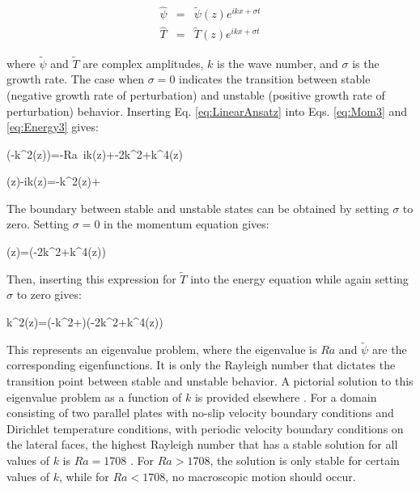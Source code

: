 \documentclass[10pt]{article}
\numberwithin{equation}{section} %
\begin{document}
\begin{subequations}
\label{eq:LinearAnsatz}
\begin{eqnarray}
\hat{\psi}&=&\tilde{\psi}(z)e^{ikx+\sigma t}\\
\hat{T}&=&\tilde{T}(z)e^{ikx+\sigma t}
\end{eqnarray}
\end{subequations}

where \(\tilde{\psi}\) and \(\tilde{T}\) are complex amplitudes, \(k\) is the wave number, and \(\sigma\) is the growth rate. The case when \(\sigma=0\) indicates the transition between stable (negative growth rate of perturbation) and unstable (positive growth rate of perturbation) behavior. Inserting Eq. \eqref{eq:LinearAnsatz} into Eqs. \eqref{eq:Mom3} and \eqref{eq:Energy3} gives:

\beq
{}\left(-k^2\tilde{\psi}(z)\right)=-Ra\ ik(z)+-2k^2+k^4\tilde{\psi}(z)
\eeq

\beq
\sigma{}(z)-ik\tilde{\psi}(z)=-k^2(z)+
\eeq

The boundary between stable and unstable states can be obtained by setting \(\sigma\) to zero. Setting \(\sigma=0\) in the momentum equation gives:

\beq
{}(z)=\left(-2k^2+k^4\tilde{\psi}(z)\right)
\eeq

Then, inserting this expression for \(\tilde{T}\) into the energy equation while again setting \(\sigma\) to zero gives:

\beq
k^2\tilde{\psi}(z)=\left(-k^2+\right)\left\lbrack\left(-2k^2+k^4\tilde{\psi}(z)\right)\right\rbrack
\eeq

This represents an eigenvalue problem, where the eigenvalue is \(Ra\) and \(\tilde{\psi}\) are the corresponding eigenfunctions. It is only the Rayleigh number that dictates the transition point between stable and unstable behavior. A pictorial solution to this eigenvalue problem as a function of \(k\) is provided elsewhere \cite{sandberg}. For a domain consisting of two parallel plates with no-slip velocity boundary conditions and Dirichlet temperature conditions, with periodic velocity boundary conditions on the lateral faces, the highest Rayleigh number that has a stable solution for all values of \(k\) is \(Ra=1708\) \cite{sandberg}. For \(Ra>1708\), the solution is only stable for certain values of \(k\), while for \(Ra<1708\), no macroscopic motion should occur.
\end{document}
